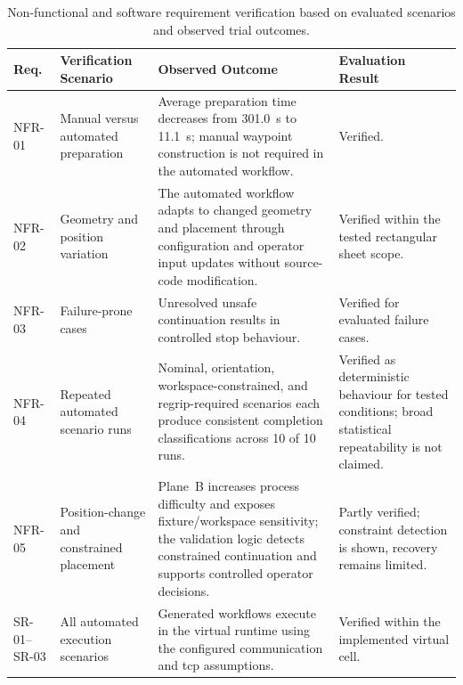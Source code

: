 \begin{table}[htbp]
\centering
\normalsize
\setlength{\tabcolsep}{3pt}
\renewcommand{\arraystretch}{1.12}

\begin{tabularx}{\textwidth}{L{1.8cm} L{3.8cm} Y L{3.2cm}}
\hline
\textbf{Req.} & \textbf{Verification Scenario} & \textbf{Observed Outcome} & \textbf{Evaluation Result} \\
\hline
NFR-01 & Manual versus automated preparation & Average preparation time decreases from \SI{301.0}{\second} to \SI{11.1}{\second}; manual waypoint construction is not required in the automated workflow. & Verified. \\
\hline
NFR-02 & Geometry and position variation & The automated workflow adapts to changed geometry and placement through configuration and operator input updates without source-code modification. & Verified within the tested rectangular sheet scope. \\
\hline
NFR-03 & Failure-prone cases & Unresolved unsafe continuation results in controlled stop behaviour. & Verified for evaluated failure cases. \\
\hline
NFR-04 & Repeated automated scenario runs & Nominal, orientation, workspace-constrained, and regrip-required scenarios each produce consistent completion classifications across 10 of 10 runs. & Verified as deterministic behaviour for tested conditions; broad statistical repeatability is not claimed. \\
\hline
NFR-05 & Position-change and constrained placement & Plane~B increases process difficulty and exposes fixture/workspace sensitivity; the validation logic detects constrained continuation and supports controlled operator decisions. & Partly verified; constraint detection is shown, recovery remains limited. \\
\hline
SR-01--SR-03 & All automated execution scenarios & Generated workflows execute in the virtual runtime using the configured communication and \ac{tcp} assumptions. & Verified within the implemented virtual cell. \\
\hline
\end{tabularx}

\caption{Non-functional and software requirement verification based on evaluated scenarios and observed trial outcomes.}
\label{tab:ch6-nfr-sr-verification}
\end{table}
